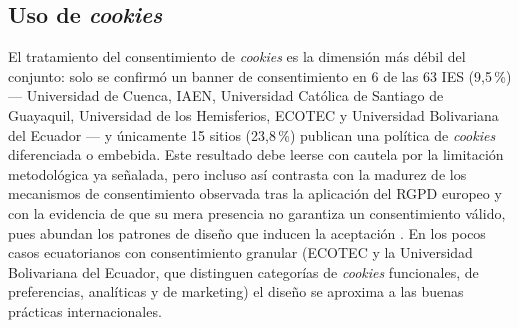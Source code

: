 \documentclass[11pt,a4paper]{article}
\begin{document}
\subsection{Uso de \emph{cookies}}
El tratamiento del consentimiento de \emph{cookies} es la dimensi\'on m\'as d\'ebil del conjunto: solo se confirm\'o un banner de consentimiento en 6 de las 63 IES (9,5\,\%) --- Universidad de Cuenca, IAEN, Universidad Cat\'olica de Santiago de Guayaquil, Universidad de los Hemisferios, ECOTEC y Universidad Bolivariana del Ecuador --- y \'unicamente 15 sitios (23,8\,\%) publican una pol\'itica de \emph{cookies} diferenciada o embebida.
Este resultado debe leerse con cautela por la limitaci\'on metodol\'ogica ya se\~nalada, pero incluso as\'i contrasta con la madurez de los mecanismos de consentimiento observada tras la aplicaci\'on del RGPD europeo y con la evidencia de que su mera presencia no garantiza un consentimiento v\'alido, pues abundan los patrones de dise\~no que inducen la aceptaci\'on \citep{nouwens2020dark,gray2021dark,habib2022okay}.
En los pocos casos ecuatorianos con consentimiento granular (ECOTEC y la Universidad Bolivariana del Ecuador, que distinguen categor\'ias de \emph{cookies} funcionales, de preferencias, anal\'iticas y de marketing) el dise\~no se aproxima a las buenas pr\'acticas internacionales.
\end{document}
